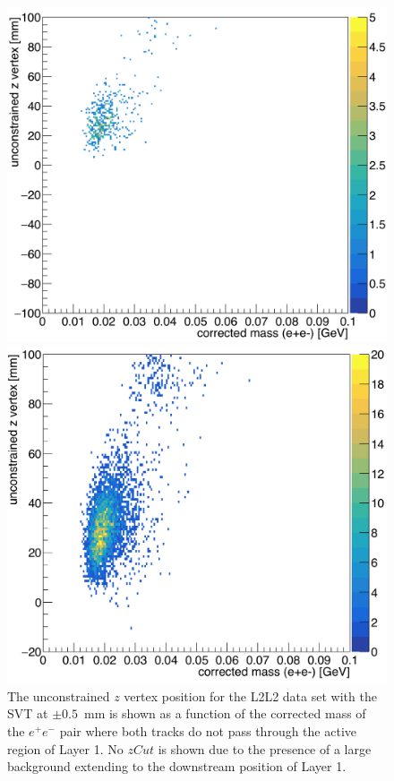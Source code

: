 \begin{figure}[hbt]
\begin{minipage}{0.5\textwidth}
 \includegraphics[width=\textwidth]{pics/appendix/zVm_L2L2_0p5_bl.png}
\end{minipage}\hfill\begin{minipage}{0.5\textwidth}
 \includegraphics[width=\textwidth]{pics/appendix/zVm_L2L2.png}
 \end{minipage}
  \caption[$z$ vertex and mass distribution for the L2L2 data set with the SVT at $\pm0.5$~mm]{The unconstrained $z$ vertex position for the L2L2 data set with the SVT at $\pm0.5$~mm is shown as a function of the corrected mass of the $e^+e^-$ pair where both tracks do not pass through the active region of Layer 1. No $zCut$ is shown due to the presence of a large background extending to the downstream position of Layer 1.}
  \label{fig:zvm_l2l2}
\end{figure}
